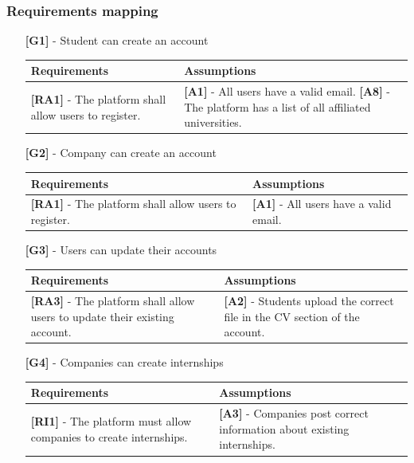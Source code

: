 \documentclass[11pt,twoside]{article}
\begin{document}
		\subsubsection{Requirements mapping}
\begin{itemize}
\item[\textbf{[G1]}] - Student can create an account
\begin{table}[H]
\begin{tabular}{| p{} | p{} |}
\hline
\textbf{Requirements} & \textbf{Assumptions} \\
\hline
\textbf{[RA1]} - The platform shall allow users  to register.
& \textbf{[A1]} - All users have a valid email. \newline 
\textbf{[A8]} - The platform has a list of all affiliated universities. \\
\hline
\end{tabular}
\end{table}

\item[\textbf{[G2]}] - Company can create an account
\begin{table}[H]
\begin{tabular}{| p{} | p{} |}
\hline
\textbf{Requirements} & \textbf{Assumptions} \\
\hline
\textbf{[RA1]} - The platform shall allow users  to register.
& \textbf{[A1]} - All users have a valid email. \\
\hline
\end{tabular}
\end{table}

\item[\textbf{[G3]}] - Users can update their accounts
\begin{table}[H]
\begin{tabular}{| p{} | p{} |}
\hline
\textbf{Requirements} & \textbf{Assumptions} \\
\hline
\textbf{[RA3]} - The platform shall allow users to update their existing account.
& \textbf{[A2]} - Students upload the correct file in the CV section of the account. \\
\hline
\end{tabular}
\end{table}

\item[\textbf{[G4]}] - Companies can create internships
\begin{table}[H]
\begin{tabular}{| p{} | p{} |}
\hline
\textbf{Requirements} & \textbf{Assumptions} \\
\hline
\textbf{[RI1]} - The platform must allow companies to create internships.
& \textbf{[A3]} - Companies post correct information about existing internships. \\
\hline
\end{tabular}
\end{table}


\end{itemize}
\end{document}
